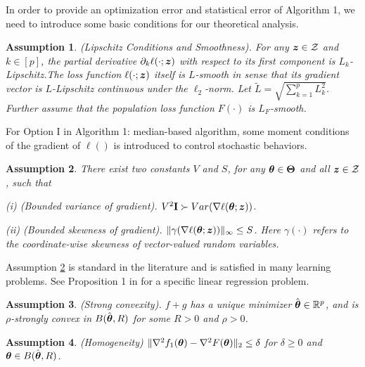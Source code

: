 \documentclass[12pt,a4paper]{article}%
\newtheorem{defi}{Definition}[section]
\newtheorem{ass}{Assumption}[section]
\newcommand \vc[1]{{\mbox{\boldmath${#1}$}}}
\newcommand \vtheta{\vc \theta}
\newcommand \vZ{\vc z}
\numberwithin{equation}{section}
\begin{document}
\vskip 8pt
In order to  provide an optimization error and statistical error of Algorithm 1, we need to introduce some basic conditions  for our theoretical analysis.%
\begin{ass}\label{ass-3-1}
(Lipschitz Conditions and Smoothness). For any $\vZ\in \mathcal{Z}$ and  $k\in[p]$, the partial derivative $\partial_k\ell(\cdot;\vZ)$ with respect to its first component is $L_k$-Lipschitz.The loss function  $\ell(\cdot;\vZ)$ itself is $L$-smooth in sense that its  gradient vector is $L$-Lipschitz continuous under the $\ell_2$-norm. {Let $\tilde{L}=\sqrt{\sum_{k=1}^pL_k^2}$. Further assume that the population loss function $F(\cdot)$ is $L_F$-smooth.}
\end{ass}

For Option I in Algorithm 1: median-based algorithm, some moment conditions of the gradient of $\ell()$ is introduced to control stochastic behaviors. %

\begin{ass}\label{ass-3-2}
There exist two constants $V$ and $S$, for any $\vtheta\in\vc\Theta$ and all $\vZ \in \mathcal{Z}$, such that

(i) (Bounded variance of gradient). $V^2{\bf I}\succ Var(\nabla \ell(\vtheta;\vZ))$.

(ii) (Bounded skewness of gradient). $\|\gamma(\nabla\ell(\vtheta;\vZ))\|_\infty\leq S$.
Here $\gamma(\cdot)$ refers to the coordinate-wise skewness of vector-valued random variables.
\end{ass}
Assumption \ref{ass-3-2} is standard in the literature and is  satisfied in many learning problems.  See Proposition 1 in \cite{YinChenRB2018} for a specific linear regression problem.
\begin{ass}\label{ass-3-3}
(Strong convexity). $f+g$ has a unique minimizer $\hat{\vtheta}\in \mathbb{R}^p$, and is $\rho$-strongly convex in $B(\hat{\vtheta},R)$ for some $R>0$ and $\rho>0$.
\end{ass}
\begin{ass}\label{ass-3-4}
(Homogeneity) $\|\nabla^2f_1(\vtheta)-\nabla^2F(\vtheta)\|_2\leq \delta$ for $\delta\geq0$ and $\vtheta\in B(\hat{\vtheta},R)$.
\end{ass}
\end{document}
